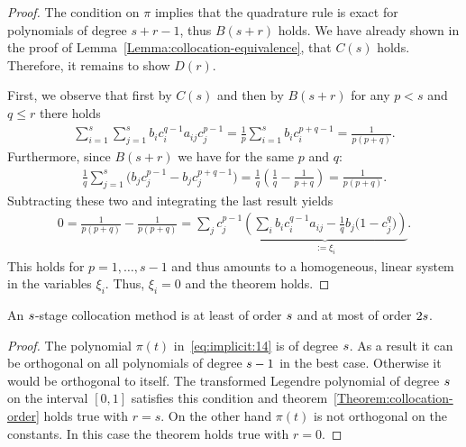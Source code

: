 \begin{proof}
  The condition on $\pi$ implies that the quadrature rule is exact for
  polynomials of degree $s+r-1$, thus $B(s+r)$ holds.
  We have already shown in the proof of
  Lemma~\ref{Lemma:collocation-equivalence}, that $C(s)$
  holds. Therefore, it remains to show $D(r)$.

  First, we observe that first by $C(s)$ and then by $B(s+r)$ for
  any $p<s$ and $q\le r$ there holds
  \begin{gather*}
    \sum_{i=1}^s\sum_{j=1}^s b_i c_i^{q-1} a_{ij} c_j^{p-1}
    = \frac1p \sum_{i=1}^s b_i c_i^{p+q-1}
    = \frac1{p(p+q)}.
  \end{gather*}
  Furthermore, since $B(s+r)$ we have for the same $p$ and $q$:
  \begin{gather*}
    \frac1q\sum_{j=1}^s\bigl(b_j c_j^{p-1} - b_j c_j^{p+q-1}\bigr)
    = \frac1q\left(\frac1q - \frac1{p+q}\right)
    = \frac1{p(p+q)}.
  \end{gather*}
  Subtracting these two and integrating the last result yields
  \begin{gather*}
    0 = \frac{1}{p(p+q)}-\frac{1}{p(p+q)} =
    \sum_{j} c_j^{p-1} \underbrace{\left(
      \sum_i b_i c_i^{q-1}a_{ij} - \frac1q b_j \bigl(1-c_j^q\bigr)
    \right)}_{:= \xi_i}.
  \end{gather*}
  This holds for $p=1,\dots,s-1$ and thus amounts to a homogeneous,
  linear system in the variables $\xi_i$. Thus, $\xi_i=0$ and the
  theorem holds.  
\end{proof}

\begin{corollary}
  An $s$-stage collocation method is at least of order
  $s$ and at most of order $2s$.
\end{corollary}

\begin{proof}
  The polynomial $\pi(t)$ in~\eqref{eq:implicit:14} is of degree
  $s$. As a result it can be orthogonal on all polynomials of
  degree $s-1$ in the best case.  Otherwise it would be orthogonal
  to itself.  The transformed Legendre polynomial of degree $s$ on
  the interval $[0,1]$ satisfies this condition and
  theorem~\ref{Theorem:collocation-order} holds true with
  $r=s$. On the other hand $\pi(t)$ is not orthogonal on the
  constants. In this case the theorem holds true with $r=0$.
\end{proof}





